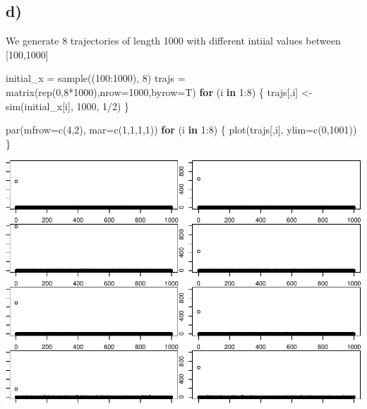 \documentclass[
]{article}
\newenvironment{Shaded}{\begin{snugshade}}{\end{snugshade}}
\newcommand{\AttributeTok}[1]{\textcolor[rgb]{0.77,0.63,0.00}{#1}}
\newcommand{\ControlFlowTok}[1]{\textcolor[rgb]{0.13,0.29,0.53}{\textbf{#1}}}
\newcommand{\DecValTok}[1]{\textcolor[rgb]{0.00,0.00,0.81}{#1}}
\newcommand{\FunctionTok}[1]{\textcolor[rgb]{0.00,0.00,0.00}{#1}}
\newcommand{\NormalTok}[1]{#1}
\newcommand{\OtherTok}[1]{\textcolor[rgb]{0.56,0.35,0.01}{#1}}
\newcommand{\SpecialCharTok}[1]{\textcolor[rgb]{0.00,0.00,0.00}{#1}}
\begin{document}
\hypertarget{d-1}{%
\subsection{d)}\label{d-1}}

We generate 8 trajectories of length 1000 with different intiial values
between {[}100,1000{]}

\begin{Shaded}
\begin{Highlighting}[]
\NormalTok{initial\_x }\OtherTok{=} \FunctionTok{sample}\NormalTok{((}\DecValTok{100}\SpecialCharTok{:}\DecValTok{1000}\NormalTok{), }\DecValTok{8}\NormalTok{)}
\NormalTok{trajs }\OtherTok{=} \FunctionTok{matrix}\NormalTok{(}\FunctionTok{rep}\NormalTok{(}\DecValTok{0}\NormalTok{,}\DecValTok{8}\SpecialCharTok{*}\DecValTok{1000}\NormalTok{),}\AttributeTok{nrow=}\DecValTok{1000}\NormalTok{,}\AttributeTok{byrow=}\NormalTok{T)}
\ControlFlowTok{for}\NormalTok{ (i }\ControlFlowTok{in} \DecValTok{1}\SpecialCharTok{:}\DecValTok{8}\NormalTok{) \{}
\NormalTok{    trajs[,i] }\OtherTok{\textless{}{-}} \FunctionTok{sim}\NormalTok{(initial\_x[i], }\DecValTok{1000}\NormalTok{, }\DecValTok{1}\SpecialCharTok{/}\DecValTok{2}\NormalTok{)}
\NormalTok{\}}
\end{Highlighting}
\end{Shaded}

\begin{Shaded}
\begin{Highlighting}[]
\FunctionTok{par}\NormalTok{(}\AttributeTok{mfrow=}\FunctionTok{c}\NormalTok{(}\DecValTok{4}\NormalTok{,}\DecValTok{2}\NormalTok{), }\AttributeTok{mar=}\FunctionTok{c}\NormalTok{(}\DecValTok{1}\NormalTok{,}\DecValTok{1}\NormalTok{,}\DecValTok{1}\NormalTok{,}\DecValTok{1}\NormalTok{))}
\ControlFlowTok{for}\NormalTok{ (i }\ControlFlowTok{in} \DecValTok{1}\SpecialCharTok{:}\DecValTok{8}\NormalTok{) \{}
    \FunctionTok{plot}\NormalTok{(trajs[,i], }\AttributeTok{ylim=}\FunctionTok{c}\NormalTok{(}\DecValTok{0}\NormalTok{,}\DecValTok{1001}\NormalTok{))}
\NormalTok{\}}
\end{Highlighting}
\end{Shaded}

\includegraphics{./figures/unnamed-chunk-15-1.pdf}
\end{document}
